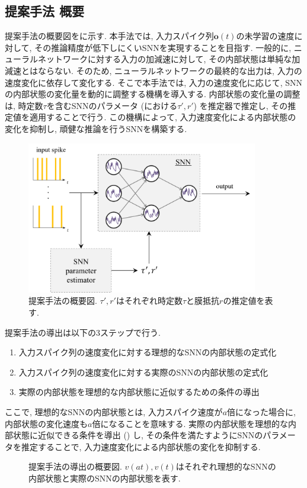 \subsection{提案手法 概要}
提案手法の概要図をに示す.
本手法では, 入力スパイク列$\bm{o}(t)$の未学習の速度に対して, その推論精度が低下しにくいSNNを実現することを目指す.
一般的に, ニューラルネットワークに対する入力の加減速に対して, その内部状態は単純な加減速とはならない.
そのため, ニューラルネットワークの最終的な出力は, 入力の速度変化に依存して変化する.
そこで本手法では, 入力の速度変化に応じて, SNNの内部状態の変化量を動的に調整する機構を導入する.
内部状態の変化量の調整は, 時定数$\tau$を含むSNNのパラメータ (における$\tau', r'$) を推定器で推定し, その推定値を適用することで行う.
この機構によって, 入力速度変化による内部状態の変化を抑制し, 頑健な推論を行うSNNを構築する.

\begin{figure}[htb]
    \centering
    \includegraphics[width=0.9\textwidth]{Static/chap2_sec2_methodstr.png}
    \caption[提案手法の概要図]{
        提案手法の概要図.
        $\tau', r'$はそれぞれ時定数$\tau$と膜抵抗$r$の推定値を表す.
    }
    \label{fig:proposed_method}
\end{figure}

提案手法の導出は以下の3ステップで行う.
\begin{enumerate}
    \item 入力スパイク列の速度変化に対する理想的なSNNの内部状態の定式化
    \item 入力スパイク列の速度変化に対する実際のSNNの内部状態の定式化
    \item 実際の内部状態を理想的な内部状態に近似するための条件の導出
\end{enumerate}
ここで, 理想的なSNNの内部状態とは, 入力スパイク速度が$a$倍になった場合に, 内部状態の変化速度も$a$倍になることを意味する.
実際の内部状態を理想的な内部状態に近似できる条件を導出 () し, その条件を満たすようにSNNのパラメータを推定することで, 入力速度変化による内部状態の変化を抑制する.
\begin{figure}[htb]
    \centering
    
    \caption[提案手法の導出の概要図]{
        提案手法の導出の概要図.
        $v(at), v(t)$はそれぞれ理想的なSNNの内部状態と実際のSNNの内部状態を表す.
    }
    \label{fig:proposed_method_intro}
\end{figure}


